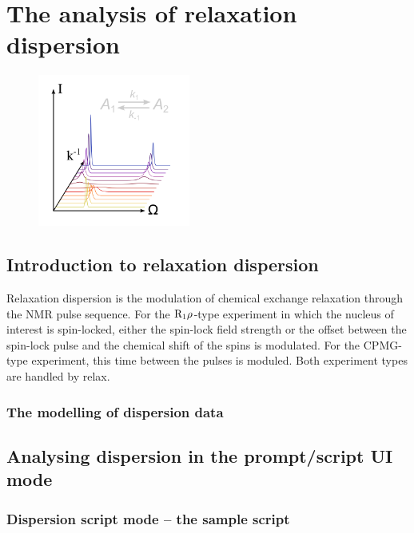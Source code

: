 
\chapter[Relaxation dispersion]{The analysis of relaxation dispersion} \label{ch: relax-disp}

\begin{figure}[h]
\includegraphics[width=5cm, bb=0 0 1701 1701]{graphics/analyses/relax_disp_600x600}
\end{figure}



\section{Introduction to relaxation dispersion}

Relaxation dispersion is the modulation of chemical exchange relaxation through the NMR pulse sequence.  For the $\mathrm{R}_1\rho$-type experiment in which the nucleus of interest is spin-locked, either the spin-lock field strength or the offset between the spin-lock pulse and the chemical shift of the spins is modulated.  For the CPMG-type experiment, this time between the pulses is moduled.  Both experiment types are handled by relax.



\subsection{The modelling of dispersion data}




\section{Analysing dispersion in the prompt/script UI mode}



\subsection{Dispersion script mode -- the sample script}


